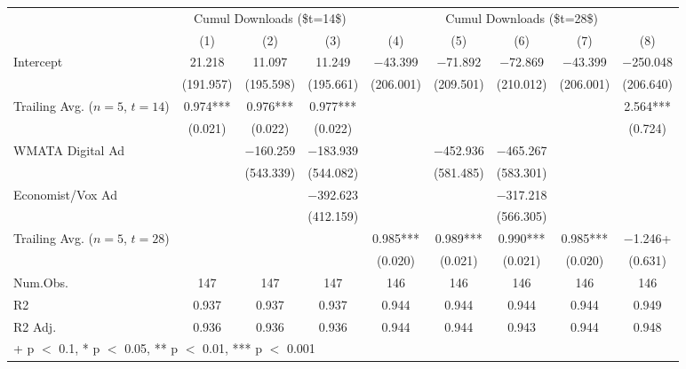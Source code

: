 \begin{table}
\centering
\begin{tabular}[t]{lcccccccc}
\toprule
\multicolumn{1}{c}{ } & \multicolumn{3}{c}{Cumul Downloads (\$t=14\$)} & \multicolumn{5}{c}{Cumul Downloads (\$t=28\$)} \\
\cmidrule(l{3pt}r{3pt}){2-4} \cmidrule(l{3pt}r{3pt}){5-9}
  & (1) & (2) & (3) & (4) & (5) & (6) & (7) & (8)\\
\midrule
Intercept & \num{21.218} & \num{11.097} & \num{11.249} & \num{-43.399} & \num{-71.892} & \num{-72.869} & \num{-43.399} & \num{-250.048}\\
 & (\num{191.957}) & (\num{195.598}) & (\num{195.661}) & (\num{206.001}) & (\num{209.501}) & (\num{210.012}) & (\num{206.001}) & (\num{206.640})\\
Trailing Avg. ($n=5$, $t=14$) & \num{0.974}*** & \num{0.976}*** & \num{0.977}*** &  &  &  &  & \num{2.564}***\\
 & (\num{0.021}) & (\num{0.022}) & (\num{0.022}) &  &  &  &  & (\num{0.724})\\
WMATA Digital Ad &  & \num{-160.259} & \num{-183.939} &  & \num{-452.936} & \num{-465.267} &  & \\
 &  & (\num{543.339}) & (\num{544.082}) &  & (\num{581.485}) & (\num{583.301}) &  & \\
Economist/Vox Ad &  &  & \num{-392.623} &  &  & \num{-317.218} &  & \\
 &  &  & (\num{412.159}) &  &  & (\num{566.305}) &  & \\
Trailing Avg. ($n=5$, $t=28$) &  &  &  & \num{0.985}*** & \num{0.989}*** & \num{0.990}*** & \num{0.985}*** & \num{-1.246}+\\
 &  &  &  & (\num{0.020}) & (\num{0.021}) & (\num{0.021}) & (\num{0.020}) & (\num{0.631})\\
\midrule
Num.Obs. & \num{147} & \num{147} & \num{147} & \num{146} & \num{146} & \num{146} & \num{146} & \num{146}\\
R2 & \num{0.937} & \num{0.937} & \num{0.937} & \num{0.944} & \num{0.944} & \num{0.944} & \num{0.944} & \num{0.949}\\
R2 Adj. & \num{0.936} & \num{0.936} & \num{0.936} & \num{0.944} & \num{0.944} & \num{0.943} & \num{0.944} & \num{0.948}\\
\bottomrule
\multicolumn{9}{l}{\rule{0pt}{1em}+ p $<$ 0.1, * p $<$ 0.05, ** p $<$ 0.01, *** p $<$ 0.001}\\
\end{tabular}
\end{table}
